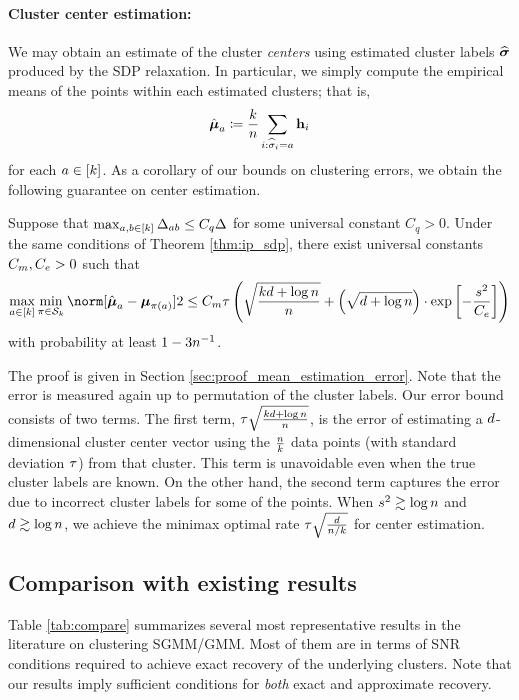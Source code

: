 \paragraph*{Cluster center estimation: }

We may obtain an estimate of the cluster \emph{centers} using estimated
cluster labels $\widehat{\boldsymbol{\sigma}}$ produced by the SDP relaxation. In particular,
we simply compute the empirical means of the points within each estimated
clusters; that is, 
\[
\hat{\boldsymbol{\mu}}_{a}\coloneqq\frac{k}{n}\sum_{i:\widehat{\sigma}_{i}=a}\mathbf{h}_{i}
\]
for each $a\in\left[k\right]$. As a corollary of our bounds
on clustering errors, we obtain the following guarantee on center
estimation.
\begin{thm}
\emph{}\label{thm:mean_estimation_error} Suppose that $\max_{a,b\in\left[k\right]}\Delta_{ab}\le C_{q}\Delta$
for some universal constant $C_{q}>0$. Under the same conditions
of Theorem \ref{thm:ip_sdp}, there exist universal constants $C_{m},C_{e}>0$
such that 
\[
\max_{a\in\left[\numclust\right]}\min_{\perm\in\calS_{\numclust}}\norm[\Meanhat_{a}-\Mean_{\perm(a)}]2\leq\constmis\sgnorm\left(\sqrt{\frac{\numclust\vecdim+\log\num}{\num}}+\left(\sqrt{\vecdim+\log\num}\right)\cdot\exp\left[-\frac{\snr^{2}}{\conste}\right]\right)
\]
with probability at least $1-3n^{-1}$.
\end{thm}
The proof is given in Section \ref{sec:proof_mean_estimation_error}.
Note that the error is measured again up to permutation of the cluster
labels. Our error bound consists of two terms. The first term, $\tau\sqrt{\frac{kd+\log n}{n}}$,
is the error of estimating a $d$-dimensional cluster center
vector using the $\frac{n}{k}$ data points (with standard
deviation $\tau$) from that cluster. This term is unavoidable
even when the true cluster labels are known. On the other hand, the
second term captures the error due to incorrect cluster labels for
some of the points. When $s^{2}\gtrsim\log n$ and $d\gtrsim\log n$,
we achieve the minimax optimal rate $\tau\sqrt{\frac{d}{n/k}}$
for center estimation. 

\subsection{Comparison with existing results\label{sec:compare}}

Table \ref{tab:compare} summarizes several most representative results
in the literature on clustering SGMM/GMM. Most of them are in terms
of SNR conditions required to achieve exact recovery of the underlying
clusters. Note that our results imply sufficient conditions for \emph{both}
exact and approximate recovery. 

